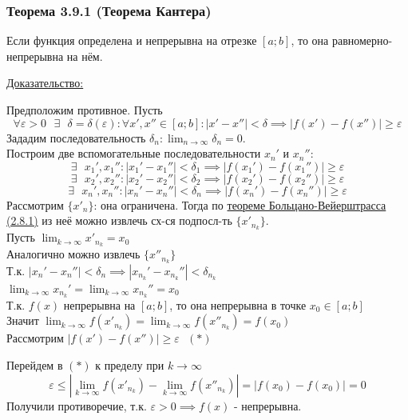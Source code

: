 \documentclass[12pt]{article}
\def\posl#1#2{\{#1_{#2}\}}
\begin{document}
    \subsubsection*{Теорема 3.9.1 (Теорема Кантера)}\label{th:3.9.1}
    Если функция определена и непрерывна на отрезке $[a; b]$, то она равномерно-непрерывна на нём.\par\noindent
    \underline{Доказательство:}
    \begin{adjustwidth}{1.5em}{1.5em}
        Предположим противное. Пусть \[\forall \varepsilon > 0 \text{ } \exists \text{ } \delta = \delta(\varepsilon) : \forall x', x'' \in [a;b] :  |x' - x''| < \delta \implies |f(x') - f(x'')| \ge \varepsilon \]
        Зададим последовательность $\delta_n : \lim_{n\to\infty} \delta_n = 0$.\\
        Построим две вспомогательные последовательности $x_n'$ и $x_n''$:
        \[ \exists \text{ } x_1', x_1'' : |x_1' - x_1''| < \delta_1 \implies |f(x_1') - f(x_1'')| \ge \varepsilon \]
        \[ \exists \text{ } x_2', x_2'' : |x_2' - x_2''| < \delta_2 \implies |f(x_2') - f(x_2'')| \ge \varepsilon \]
        \[ \exists \text{ } x_n', x_n'' : |x_n' - x_n''| < \delta_n \implies |f(x_n') - f(x_n'')| \ge \varepsilon \]
        Рассмотрим $\posl{x'}{n}$: она ограничена. Тогда по \hyperref[th:2.8.1]{теореме Больцано-Вейерштрасса (2.8.1)} из неё можно извлечь сх-ся подпосл-ть $\posl{x'}{n_k}$.\\
        Пусть $\lim_{k\to\infty} x'_{n_k} = x_0$\\
        Аналогично можно извлечь $\posl{x''}{n_k}$\\
        Т.к. $|x_n' - x_n''| < \delta_n \implies |x_{n_k}' - x_{n_k}''| < \delta_{n_k}$\\
        $\lim_{k\to\infty}x_{n_k}' = \lim_{k\to\infty}x_{n_k}'' = x_0$\\
        Т.к. $f(x)$ непрерывна на $[a; b]$, то она непрерывна в точке $x_0 \in [a;b]$\\
        Значит $\lim_{k\to\infty}f(x'_{n_k}) = \lim_{k\to\infty}f(x''_{n_k}) = f(x_0)$\\
        Рассмотрим $|f(x') - f(x'')| \ge \varepsilon \,\,\,\, (*)$
        \begin{adjustwidth}{1.5em}{1.5em}
            Перейдем в $(*)$ к пределу при $k \to \infty$
            \[ \varepsilon \le | \lim_{k\to\infty}f(x'_{n_k}) - \lim_{k\to\infty}f(x''_{n_k})| = |f(x_0) - f(x_0)| = 0 \]
            Получили противоречие, т.к. $\varepsilon > 0 \implies f(x)$ - непрерывна.
        \end{adjustwidth}
    \end{adjustwidth}
\end{document}
